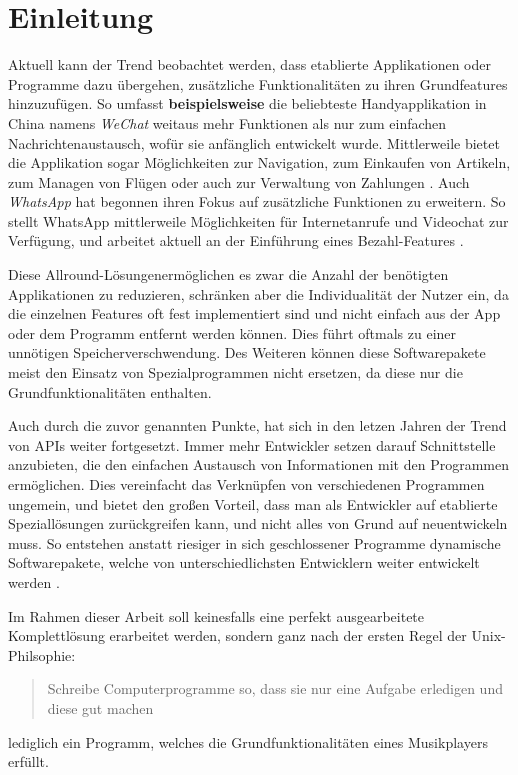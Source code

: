 
\chapter{Einleitung}
Aktuell kann der Trend beobachtet werden, dass etablierte Applikationen oder
Programme dazu übergehen, zusätzliche Funktionalitäten zu ihren Grundfeatures
hinzuzufügen. So umfasst \textbf{beispielsweise} die beliebteste Handyapplikation in China namens
\textit{WeChat} weitaus mehr Funktionen als nur zum einfachen
Nachrichtenaustausch, wofür sie anfänglich entwickelt wurde. Mittlerweile
bietet die Applikation sogar Möglichkeiten zur Navigation, zum
Einkaufen von Artikeln, zum Managen von Flügen oder auch zur Verwaltung von
Zahlungen \autocite{was_ist_wechat?_2019}. Auch \textit{WhatsApp} hat begonnen ihren
Fokus auf zusätzliche Funktionen zu erweitern. So stellt WhatsApp mittlerweile
Möglichkeiten für Internetanrufe und Videochat zur Verfügung, und arbeitet
aktuell an der Einführung eines Bezahl-Features \autocite{shead_2019}. \hfill
\break


Diese \glqq Allround-Lösungen\grqq \space ermöglichen es zwar die Anzahl der
benötigten Applikationen zu reduzieren, schränken aber die Individualität der
Nutzer ein, da die einzelnen Features oft fest implementiert sind und nicht
einfach aus der App oder dem Programm entfernt werden können. Dies führt
oftmals zu einer unnötigen Speicherverschwendung. Des Weiteren können diese
Softwarepakete meist den Einsatz von Spezialprogrammen nicht ersetzen, da diese
nur die Grundfunktionalitäten enthalten. \hfill \break


Auch durch die zuvor genannten Punkte, hat sich in den letzen Jahren der Trend
von \acp{API} weiter fortgesetzt. Immer mehr Entwickler setzen darauf
Schnittstelle anzubieten, die den einfachen Austausch von Informationen mit den
Programmen ermöglichen. Dies vereinfacht das Verknüpfen von verschiedenen
Programmen ungemein, und bietet den großen Vorteil, dass man als Entwickler auf
etablierte Speziallösungen zurückgreifen kann, und nicht alles von Grund auf
neuentwickeln muss. So entstehen anstatt riesiger in sich geschlossener Programme
dynamische Softwarepakete, welche von unterschiedlichsten Entwicklern weiter
entwickelt werden \autocite{babati_2018} \autocite{sandoval_2018}. \hfill
\break


Im Rahmen dieser Arbeit soll keinesfalls eine perfekt ausgearbeitete
Komplettlösung erarbeitet werden, sondern ganz nach der ersten Regel der
Unix-Philsophie:
\begin{quote}
\glqq Schreibe Computerprogramme so, dass sie nur eine Aufgabe erledigen und diese gut machen\grqq \autocite{gancarz_1997}
\end{quote}
lediglich ein Programm, welches die Grundfunktionalitäten eines Musikplayers erfüllt.
\hfill \break


